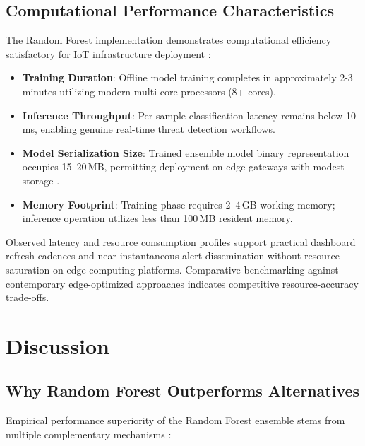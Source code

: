 \documentclass[conference]{IEEEtran}
\begin{document}
\subsection{Computational Performance Characteristics}

The Random Forest implementation demonstrates computational efficiency satisfactory for IoT infrastructure deployment \cite{b5}:

\begin{itemize}
\item \textbf{Training Duration}: Offline model training completes in approximately 2-3 minutes utilizing modern multi-core processors (8+ cores).
\item \textbf{Inference Throughput}: Per-sample classification latency remains below 10\,ms, enabling genuine real-time threat detection workflows.
\item \textbf{Model Serialization Size}: Trained ensemble model binary representation occupies 15--20\,MB, permitting deployment on edge gateways with modest storage \cite{b14}.
\item \textbf{Memory Footprint}: Training phase requires 2--4\,GB working memory; inference operation utilizes less than 100\,MB resident memory.
\end{itemize}

Observed latency and resource consumption profiles support practical dashboard refresh cadences and near-instantaneous alert dissemination without resource saturation on edge computing platforms. Comparative benchmarking against contemporary edge-optimized approaches \cite{b2} indicates competitive resource-accuracy trade-offs.

\section{Discussion}

\subsection{Why Random Forest Outperforms Alternatives}

Empirical performance superiority of the Random Forest ensemble stems from multiple complementary mechanisms \cite{b21}:
\end{document}
